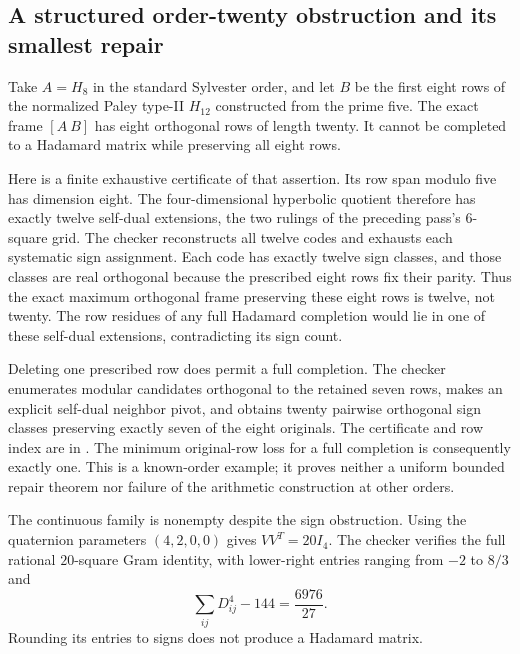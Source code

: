 \documentclass[11pt]{article}
\begin{document}
\subsection{A structured order-twenty obstruction and its smallest repair}
Take $A=H_8$ in the standard Sylvester order, and let $B$ be the
first eight rows of the normalized Paley type-II $H_{12}$ constructed
from the prime five. The exact frame $[A\ B]$ has eight orthogonal
rows of length twenty. It cannot be completed to a Hadamard matrix
while preserving all eight rows.

Here is a finite exhaustive certificate of that assertion.
Its row span modulo five has dimension eight. The four-dimensional
hyperbolic quotient therefore has exactly twelve self-dual
extensions, the two rulings of the preceding pass's $6$-square grid.
The checker reconstructs all twelve codes and exhausts each
systematic sign assignment. Each code has exactly twelve sign
classes, and those classes are real orthogonal because the
prescribed eight rows fix their parity. Thus the exact maximum
orthogonal frame preserving these eight rows is twelve, not twenty.
The row residues of any full Hadamard completion would lie in one
of these self-dual extensions, contradicting its sign count.

Deleting one prescribed row does permit a full completion.
The checker enumerates modular candidates orthogonal to the retained
seven rows, makes an explicit self-dual neighbor pivot, and obtains
twenty pairwise orthogonal sign classes preserving exactly seven of
the eight originals. The certificate and row index are in
. The minimum original-row loss for a
full completion is consequently exactly one.
This is a known-order example; it proves neither a uniform bounded
repair theorem nor failure of the arithmetic construction at other orders.

The continuous family is nonempty despite the sign obstruction.
Using the quaternion parameters $(4,2,0,0)$ gives $VV^T=20I_4$.
The checker verifies the full rational $20$-square Gram identity,
with lower-right entries ranging from $-2$ to $8/3$ and
\[
                    \sum_{ij}D_{ij}^4-144=\frac{6976}{27}.
\]
Rounding its entries to signs does not produce a Hadamard matrix.
\end{document}
